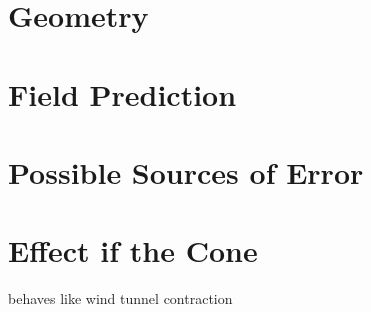 \label{sec:field}

\section{Geometry}


\section{Field Prediction}

\section{Possible Sources of Error}

\section{Effect if the Cone}

behaves like wind tunnel contraction